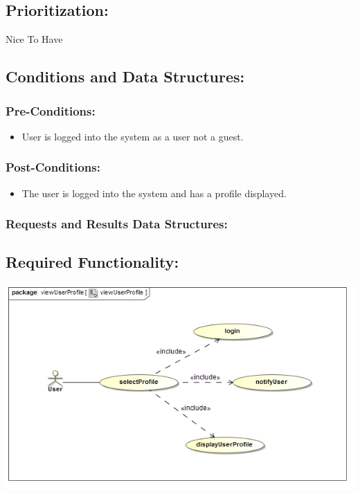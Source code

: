 \documentclass[a4paper,11pt]{article}
\begin{document}
\subsection{Prioritization:} 
\textbf{}Nice To Have
\subsection{Conditions and Data Structures:}
\subsubsection*{Pre-Conditions:}
\begin{itemize}
\item User is logged into the system as a user not a guest. 
\end{itemize}
\subsubsection*{Post-Conditions:}
\begin{itemize}
\item The user is logged into the system and has a profile displayed.
\end{itemize}
\subsubsection*{Requests and Results Data Structures:}
\subsection{Required Functionality:} 
\includegraphics[width=1\linewidth]{./Images/UserProfile/ViewUserProfileUseCase}
\end{document}
